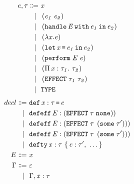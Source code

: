 \begin{multicols}{2}
	\begin{align*}
		e, \tau\Coloneqq&\ \mathit{x}\\
			\lvert\ &\ \left(\mathit{e_1}\;\mathit{e_2}\right)\\
			\lvert\ &\ \left(\texttt{handle}\,\mathit{E}\,\texttt{with}\,\mathit{e_1}\,\texttt{in}\,\mathit{e_2}\right)\\
			\lvert\ &\ \left(\lambda\mathit{x}.\mathit{e}\right)\\
			\lvert\ &\ \left(\texttt{let}\,\mathit{x}\,\texttt{=}\,\mathit{e_1}\,\texttt{in}\,\mathit{e_2}\right)\\
			\lvert\ &\ \left(\texttt{perform}\;\mathit{E}\;\mathit{e}\right)\\
			\lvert\ &\ \left(\Pi\,\mathit{x}:\mathit{\tau_1}.\ \mathit{\tau_2}\right)\\
			\lvert\ &\ \left(\texttt{EFFECT}\;\mathit{\tau_1}\;\mathit{\tau_2}\right)\\
			\lvert\ &\ \texttt{TYPE}\\
	\end{align*}\break
	\begin{align*}
		\DefineTerm{decl}{\StahlDef{x}{\StahlName{\tau}}{\StahlName{e}}}
			\Case{\StahlDefEffNoReturn{E}{\StahlName{\tau}}}
			\Case{\StahlDefEff{E}{\StahlName{\tau}}{\StahlName{\tau'}}}
			\Case{\StahlDefEff{E}{\StahlName{\tau}}{\StahlName{\tau'}}}
			\Case{\StahlDefTy{x}{\StahlName{\tau}}{\StahlCtor{c}{\tau'},\ \ldots}}
		\DefineTerm{E}{\StahlName{x}}
		\DefineTerm{\Gamma}{\varepsilon}
		\Case{\Gamma,\StahlName{x}:\StahlName{\tau}}
	\end{align*}
\end{multicols}
